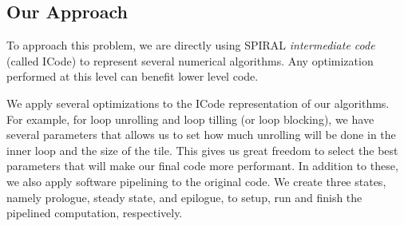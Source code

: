 \documentclass[10pt]{article}
\begin{document}

\subsection{Our Approach}

To approach this problem, we are directly using SPIRAL \emph{intermediate code} (called ICode)
to represent several numerical algorithms. Any optimization performed at this level can benefit
lower level code.

We apply several optimizations to the ICode representation of our algorithms. For example,
for loop unrolling and loop tilling (or loop blocking), we have several parameters that allows
us to set how much unrolling will be done in the inner loop and the size of the tile.
This gives us great freedom to select the best parameters that will make our final code more
performant. In addition to these, we also apply software pipelining to the original code.
We create three states, namely prologue, steady state, and epilogue, to setup, run and finish
the pipelined computation, respectively.
\end{document}
